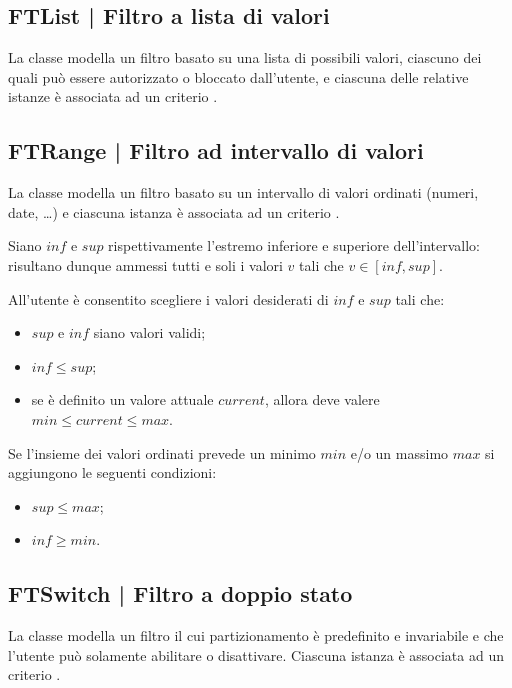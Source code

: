 \documentclass[10pt,a4paper,headinclude,footinclude,hidelinks]{scrreprt} %
\begin{document}
	\subsection[FTList]{FTList | Filtro a lista di valori}
	\label{sec:stage:design:model.filter:list-filter}
	La classe \textit{} modella un filtro basato su una lista di possibili valori, ciascuno dei quali può essere autorizzato o bloccato dall'utente, e ciascuna delle relative istanze è associata ad un criterio \textit{}.

	\subsection[FTRange]{FTRange | Filtro ad intervallo di valori}
	\label{sec:stage:design:model.filter:range-filter}
	La classe \textit{} modella un filtro basato su un intervallo di valori ordinati (numeri, date, \ldots) e ciascuna istanza è associata ad un criterio \textit{}.

	Siano $inf$ e $sup$ rispettivamente l'estremo inferiore e superiore dell'intervallo: risultano dunque ammessi tutti e soli i valori $v$ tali che $v \in \left[inf,sup\right]$.

	All'utente è consentito scegliere i valori desiderati di $inf$ e $sup$ tali che:
	\begin{itemize}
	\item $sup$ e $inf$ siano valori validi;
	\item $inf \leq sup$;
	\item se è definito un valore attuale $current$, allora deve valere $min \leq current \leq max$.
	\end{itemize}

	Se l'insieme dei valori ordinati prevede un minimo $min$ e/o un massimo $max$ si aggiungono le seguenti condizioni:
	\begin{itemize}
	\item $sup \leq max$;
	\item $inf \geq min$.
	\end{itemize}

	\subsection[FTSwitch]{FTSwitch | Filtro a doppio stato}
	\label{sec:stage:design:model.filter:switch-filter}
	La classe \textit{} modella un filtro il cui partizionamento è predefinito e invariabile e che l'utente può solamente abilitare o disattivare. Ciascuna istanza è associata ad un criterio \textit{}.
\end{document}
